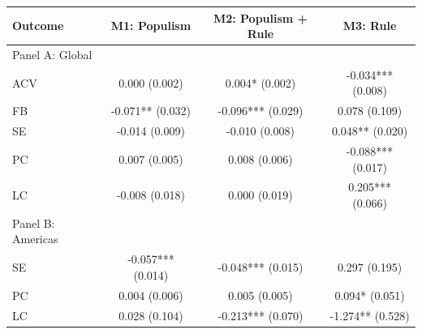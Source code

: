 \begin{tabular}{lccc}
\toprule
Outcome & M1: Populism & M2: Populism + Rule & M3: Rule \\
\midrule
Panel A: Global &  &  &  \\
ACV & 0.000 (0.002) & 0.004* (0.002) & -0.034*** (0.008) \\
FB & -0.071** (0.032) & -0.096*** (0.029) & 0.078 (0.109) \\
SE & -0.014 (0.009) & -0.010 (0.008) & 0.048** (0.020) \\
PC & 0.007 (0.005) & 0.008 (0.006) & -0.088*** (0.017) \\
LC & -0.008 (0.018) & 0.000 (0.019) & 0.205*** (0.066) \\
Panel B: Americas &  &  &  \\
SE & -0.057*** (0.014) & -0.048*** (0.015) & 0.297 (0.195) \\
PC & 0.004 (0.006) & 0.005 (0.005) & 0.094* (0.051) \\
LC & 0.028 (0.104) & -0.213*** (0.070) & -1.274** (0.528) \\
\bottomrule
\end{tabular}
